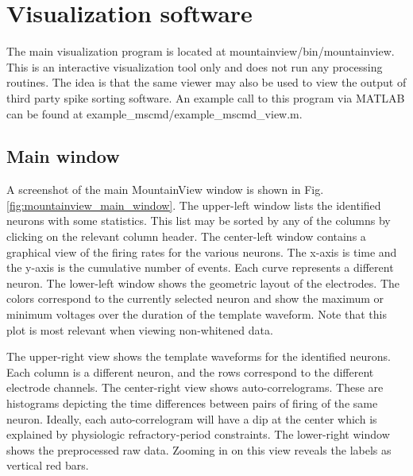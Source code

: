 \documentclass[hidelinks,10pt]{article}
\begin{document}
\section {Visualization software}

The main visualization program is located at mountainview/bin/mountainview. This is an interactive visualization tool only and does not run any processing routines. The idea is that the same viewer may also be used to view the output of third party spike sorting software. An example call to this program via MATLAB can be found at example\_mscmd/example\_mscmd\_view.m.

\subsection {Main window}

A screenshot of the main MountainView window is shown in Fig. \ref{fig:mountainview_main_window}.
The upper-left window lists the identified neurons with some statistics. This list may be sorted by any of the columns by clicking on the relevant column header. The center-left window contains a graphical view of the firing rates for the various neurons. The x-axis is time and the y-axis is the cumulative number of events. Each curve represents a different neuron. The lower-left window shows the geometric layout of the electrodes. The colors correspond to the currently selected neuron and show the maximum or minimum voltages over the duration of the template waveform. Note that this plot is most relevant when viewing non-whitened data.

The upper-right view shows the template waveforms for the identified neurons. Each column is a different neuron, and the rows correspond to the different electrode channels. The center-right view shows auto-correlograms. These are histograms depicting the time differences between pairs of firing of the same neuron. Ideally, each auto-correlogram will have a dip at the center which is explained by physiologic refractory-period constraints. The lower-right window shows the preprocessed raw data. Zooming in on this view reveals the labels as vertical red bars.
\end{document}
